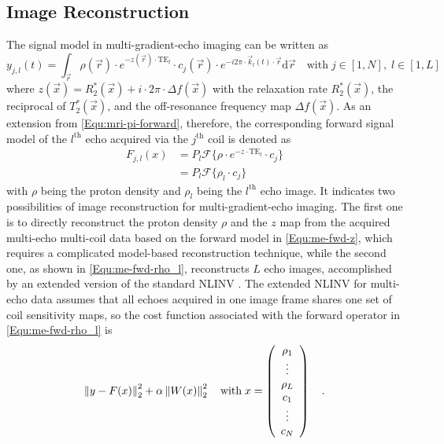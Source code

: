 \subsection{Image Reconstruction} \label{Sec:me-theory-reco}
The signal model in multi-gradient-echo imaging can be written as
\begin{equation} \label{Equ:me-signal}
  y_{j,l}(t) = \int_{\vec{r}} \rho(\vec{r}) \cdot e^{- z(\vec{r}) \cdot \text{TE}_l} \cdot c_{j}(\vec{r}) \cdot e^{-i 2\pi \cdot \vec{k}_{l}(t) \cdot \vec{r}} \text{d}\vec{r} \quad \text{with} \; j \in [1,N],\; l \in [1,L]
\end{equation}
where $z(\vec{x}) = R_2^* (\vec{x}) + i \cdot 2\pi\cdot \Delta f (\vec{x})$ with the relaxation rate $R_2^* (\vec{x})$, the reciprocal of $T_2^* (\vec{x})$, and the off-resonance frequency map $\Delta f(\vec{x})$. As an extension from \cref{Equ:mri-pi-forward}, therefore, the corresponding forward signal model of the $l^\text{th}$ echo acquired via the $j^\text{th}$ coil is denoted as
\begin{align} 
  F_{j,l} (x) &= P_l \mathcal{F} \{\rho \cdot e^{- z \cdot \text{TE}_l} \cdot c_j \} \label{Equ:me-fwd-z} \\
              &= P_l \mathcal{F} \{\rho_l \cdot c_j \} \label{Equ:me-fwd-rho_l}
\end{align}
with $\rho$ being the proton density and $\rho_l$ being the $l^\text{th}$ echo image. It indicates two possibilities of image reconstruction for multi-gradient-echo imaging. The first one is to directly reconstruct the proton density $\rho$ and the $z$ map from the acquired multi-echo multi-coil data based on the forward model in \cref{Equ:me-fwd-z}, which requires a complicated model-based reconstruction technique, while the second one, as shown in \cref{Equ:me-fwd-rho_l}, reconstructs $L$ echo images, accomplished by an extended version of the standard NLINV \cite{2008_NLINV,2010_NLINV_Heart,2010_20ms_Uecker}. The extended NLINV for multi-echo data assumes that all echoes acquired in one image frame shares one set of coil sensitivity maps, so the cost function associated with the forward operator in \cref{Equ:me-fwd-rho_l} is
\begin{equation} \label{Equ:me_GN_cost}
  \left\lVert y-F(x)\right\rVert_2^2 + \alpha \left\lVert W(x)\right\rVert_2^2 \quad \text{with} \; x = \left( \begin{array}{c} 
  \rho_1 \\
  \vdots \\
  \rho_L \\
  c_1    \\
  \vdots \\
  c_N
  \end{array} \right) \quad .
\end{equation}
